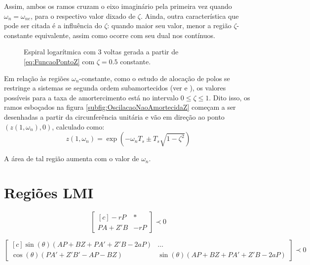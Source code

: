 Assim, ambos os ramos cruzam o eixo imaginário pela primeira vez quando $\omega_n = \omega_{ne}$, para o respectivo valor dixado de $\zeta$. Ainda, outra característica que pode ser citada é a influência do $\zeta$: quando maior seu valor, menor a região $\zeta$-constante equivalente, assim como ocorre com seu dual nos contínuos.

\begin{figure}[!ht]
  \centering
  
  \caption{Espiral logarítmica com 3 voltas gerada a partir de \eqref{eq:FuncaoPontoZ} com $\zeta=0.5$ constante.}
  \label{fig:EspiralLogaritmica}
\end{figure}

Em relação às regiões $\omega_n$-constante, como o estudo de alocação de polos se restringe a sistemas se segunda ordem subamortecidos (ver \cite{NISE2011} e \cite{OGATA2011}), os valores possíveis para a taxa de amortercimento está no intervalo $0 \leq \zeta \leq 1$. Dito isso, os ramos esboçados na figura \ref{subfig:OscilacaoNaoAmortecidaZ} começam a ser desenhadas a partir da circunferência unitária e vão em direção ao ponto $(z(1,\omega_n),0)$, calculado como:
\begin{equation}
  z(1,\omega_n) = \exp{\left(-\omega_nT_s \pm T_s\sqrt{1-\zeta^2}\right)}\label{eq:PontoExtremoWnZ}
\end{equation}

A área de tal região aumenta com o valor de $\omega_n$.

\section{Regiões LMI}

\begin{equation}
  \begin{bmatrix*}[c]
    -rP       & * \\
    PA + Z'B  & -rP
  \end{bmatrix*}
  \prec 0\label{eq:LMIEstabilidadeRelativa}
\end{equation}

\begin{equation}
  \begin{bmatrix*}[c]
    \sin{(\theta)(AP + BZ + PA' + Z'B -2aP)} &  \dots \\
    \cos{(\theta)(PA' + Z'B'- AP - BZ)}      &  \sin{(\theta)(AP + BZ + PA' + Z'B -2aP)}
  \end{bmatrix*}
  \prec 0\label{eq:LMIESetorConicoEsquerdo}
\end{equation}

